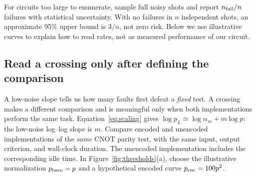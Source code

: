 \documentclass[11pt,a4paper]{article}
\begin{document}
For circuits too large to enumerate, sample full noisy shots and report $n_{\rm fail}/n$ failures with statistical uncertainty. With no failures in $n$ independent shots, an approximate 95\% upper bound is $3/n$, not zero risk. Below we use illustrative curves to explain how to read rates, not as measured performance of our circuit.

\subsection{Read a crossing only after defining the comparison}
A low-noise slope tells us how many faults first defeat a \emph{fixed} test. A crossing makes a different comparison and is meaningful only when both implementations perform the same task. Equation~\eqref{eq:scaling} gives $\log p_L\simeq\log\alpha_m+m\log p$: the low-noise log--log slope is $m$. Compare encoded and unencoded implementations of the \emph{same} CNOT parity test, with the same input, output criterion, and wall-clock duration. The unencoded implementation includes the corresponding idle time. In Figure~\ref{fig:thresholds}(a), choose the illustrative normalization $p_{\rm bare}=p$ and a hypothetical encoded curve $p_{\rm enc}=100p^2$.
\end{document}
